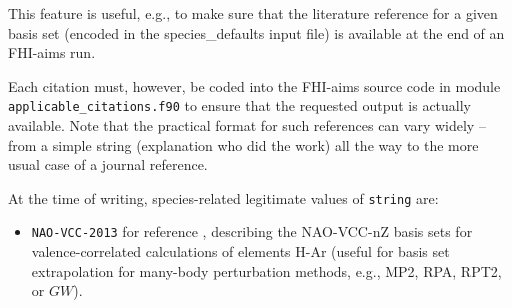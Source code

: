 This feature is useful, e.g., to make sure that the literature reference for
a given basis set (encoded in the species\_defaults input file) is available
at the end of an FHI-aims run. 

Each citation must, however, be coded into the FHI-aims source code
in module \texttt{applicable\_citations.f90} to ensure that the requested 
output is actually available. Note that the practical format for such references
can vary widely -- from a simple string (explanation who did the work)
all the way to the more usual case of a journal reference.

At the time of writing, species-related legitimate values of \texttt{string} are:
\begin{itemize}
  \item \texttt{NAO-VCC-2013} for reference \cite{Zhang2013},
    describing the NAO-VCC-nZ basis sets for valence-correlated
    calculations of elements H-Ar (useful for basis set extrapolation
    for many-body perturbation methods, e.g., MP2, RPA, RPT2, or
    $GW$). 
\end{itemize}
